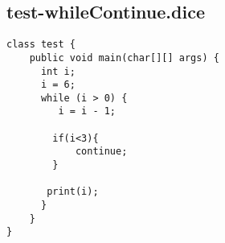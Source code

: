 \subsection{test-whileContinue.dice}
\begin{verbatim}
class test {
	public void main(char[][] args) {
	  int i;
	  i = 6;
	  while (i > 0) {
	  	 i = i - 1;
	    
	    if(i<3){
	    	continue;
	    }
	   
	   print(i);
	  }
	}
}


\end{verbatim}